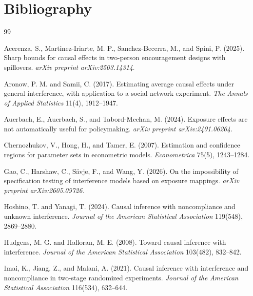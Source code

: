 \documentclass[11pt]{article}
\theoremstyle{definition}
\theoremstyle{plain}
\theoremstyle{remark}
\begin{document}
\section*{Bibliography}
\begin{thebibliography}{99}

Acerenza, S., Martinez-Iriarte, M. P., Sanchez-Becerra, M., and Spini, P. (2025).
Sharp bounds for causal effects in two-person encouragement designs with spillovers.
\emph{arXiv preprint arXiv:2503.14314}.

Aronow, P. M. and Samii, C. (2017).
Estimating average causal effects under general interference, with application to a social network experiment.
\emph{The Annals of Applied Statistics} 11(4), 1912--1947.

Auerbach, E., Auerbach, S., and Tabord-Meehan, M. (2024).
Exposure effects are not automatically useful for policymaking.
\emph{arXiv preprint arXiv:2401.06264}.

Chernozhukov, V., Hong, H., and Tamer, E. (2007).
Estimation and confidence regions for parameter sets in econometric models.
\emph{Econometrica} 75(5), 1243--1284.

Gao, C., Harshaw, C., S\"{a}vje, F., and Wang, Y. (2026).
On the impossibility of specification testing of interference models based on exposure mappings.
\emph{arXiv preprint arXiv:2605.09726}.

Hoshino, T. and Yanagi, T. (2024).
Causal inference with noncompliance and unknown interference.
\emph{Journal of the American Statistical Association} 119(548), 2869--2880.

Hudgens, M. G. and Halloran, M. E. (2008).
Toward causal inference with interference.
\emph{Journal of the American Statistical Association} 103(482), 832--842.

Imai, K., Jiang, Z., and Malani, A. (2021).
Causal inference with interference and noncompliance in two-stage randomized experiments.
\emph{Journal of the American Statistical Association} 116(534), 632--644.


\end{thebibliography}
\end{document}
